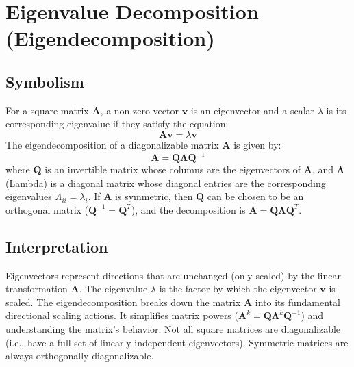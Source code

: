 \documentclass{article}
\newcommand{\vect}[1]{\bm{#1}} %
\newcommand{\mat}[1]{\bm{#1}}  %
\begin{document}
\section{Eigenvalue Decomposition (Eigendecomposition)}

\subsection*{Symbolism}
For a square matrix $\mat{A}$, a non-zero vector $\vect{v}$ is an eigenvector and a scalar $\lambda$ is its corresponding eigenvalue if they satisfy the equation:
\[ \mat{A}\vect{v} = \lambda \vect{v} \]
The eigendecomposition of a diagonalizable matrix $\mat{A}$ is given by:
\[ \mat{A} = \mat{Q} \mat{\Lambda} \mat{Q}^{-1} \]
where $\mat{Q}$ is an invertible matrix whose columns are the eigenvectors of $\mat{A}$, and $\mat{\Lambda}$ (Lambda) is a diagonal matrix whose diagonal entries are the corresponding eigenvalues $\Lambda_{ii} = \lambda_i$.
If $\mat{A}$ is symmetric, then $\mat{Q}$ can be chosen to be an orthogonal matrix ($\mat{Q}^{-1} = \mat{Q}^T$), and the decomposition is $\mat{A} = \mat{Q} \mat{\Lambda} \mat{Q}^T$.

\subsection*{Interpretation}
Eigenvectors represent directions that are unchanged (only scaled) by the linear transformation $\mat{A}$. The eigenvalue $\lambda$ is the factor by which the eigenvector $\vect{v}$ is scaled. The eigendecomposition breaks down the matrix $\mat{A}$ into its fundamental directional scaling actions. It simplifies matrix powers ($\mat{A}^k = \mat{Q} \mat{\Lambda}^k \mat{Q}^{-1}$) and understanding the matrix's behavior. Not all square matrices are diagonalizable (i.e., have a full set of linearly independent eigenvectors). Symmetric matrices are always orthogonally diagonalizable.
\end{document}
